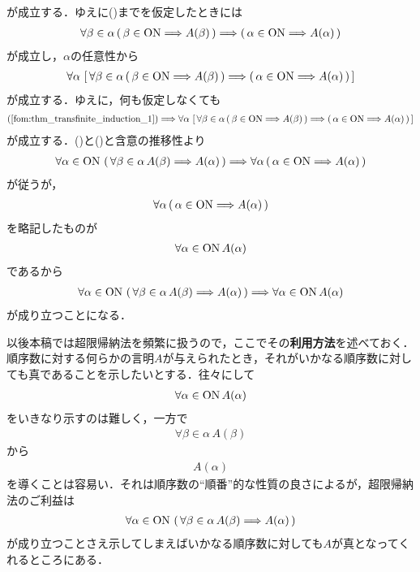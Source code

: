 \begin{prf}
		が成立する．ゆえに()までを仮定したときには
		\begin{align}
			\forall \beta \in \alpha\, (\, \beta \in \mathrm{ON} \Longrightarrow A(\beta)\, )
			\Longrightarrow (\, \alpha \in \mathrm{ON} \Longrightarrow A(\alpha)\, )
		\end{align}
		が成立し，$\alpha$の任意性から
		\begin{align}
			\forall \alpha\, \left[\, \forall \beta \in \alpha\, (\, \beta \in \mathrm{ON} \Longrightarrow A(\beta)\, )
			\Longrightarrow (\, \alpha \in \mathrm{ON} \Longrightarrow A(\alpha)\, )\, \right]
		\end{align}
		が成立する．ゆえに，何も仮定しなくても
		\begin{align}
			(\refeq{fom:thm_transfinite_induction_1}) \Longrightarrow
			\forall \alpha\, \left[\, \forall \beta \in \alpha\, (\, \beta \in \ON \Longrightarrow A(\beta)\, )
			\Longrightarrow (\, \alpha \in \ON \Longrightarrow A(\alpha)\, )\, \right]
			\label{fom:thm_transfinite_induction_3}
		\end{align}
		が成立する．()と()と含意の推移性より
		\begin{align}
			\forall \alpha \in \mathrm{ON}\, \left(\, \forall \beta \in \alpha\, A(\beta) \Longrightarrow A(\alpha)\, \right)
			\Longrightarrow \forall \alpha\, (\, \alpha \in \mathrm{ON} \Longrightarrow A(\alpha)\, )
		\end{align}
		が従うが，
		\begin{align}
			\forall \alpha\, (\, \alpha \in \mathrm{ON} \Longrightarrow A(\alpha)\, )
		\end{align}
		を略記したものが
		\begin{align}
			\forall \alpha \in \mathrm{ON}\, A(\alpha)
		\end{align}
		であるから
		\begin{align}
			\forall \alpha \in \mathrm{ON}\, \left(\, \forall \beta \in \alpha\, A(\beta) \Longrightarrow A(\alpha)\, \right)
			\Longrightarrow \forall \alpha \in \mathrm{ON}\, A(\alpha)
		\end{align}
		が成り立つことになる．
		\QED
	\end{prf}
	
	
	以後本稿では超限帰納法を頻繁に扱うので，ここでその{\bf 利用方法}を述べておく．
	順序数に対する何らかの言明$A$が与えられたとき，それがいかなる順序数に対しても真であることを示したいとする．往々にして
	\begin{align}
		\forall \alpha \in \mathrm{ON}\, A(\alpha)
	\end{align}
	をいきなり示すのは難しく，一方で
	\begin{align}
		\forall \beta \in \alpha\, A(\beta)
	\end{align}
	から
	\begin{align}
		A(\alpha)
	\end{align}
	を導くことは容易い．それは順序数の``順番''的な性質の良さによるが，超限帰納法のご利益は
	\begin{align}
		\forall \alpha \in \mathrm{ON}\, \left(\, \forall \beta \in \alpha\, A(\beta) \Longrightarrow A(\alpha)\, \right)
	\end{align}
	が成り立つことさえ示してしまえばいかなる順序数に対しても$A$が真となってくれるところにある．
	
